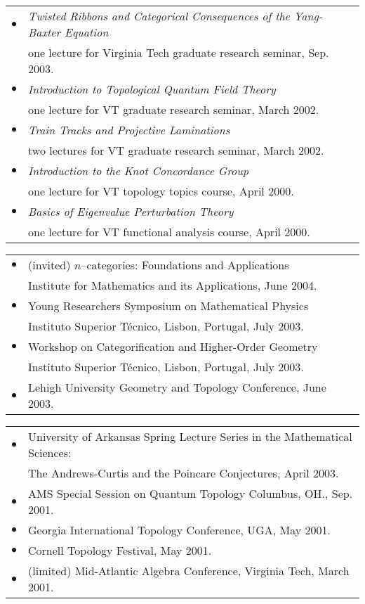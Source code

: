 \documentclass[10pt]{article}
\begin{document}

\begin{tabular}{ll}
$\bullet$&{\itshape Twisted Ribbons and Categorical Consequences of the Yang-Baxter Equation}\\
&one lecture for Virginia Tech graduate research seminar, Sep. 2003.\\
$\bullet$&{\itshape Introduction to Topological Quantum Field Theory}\\
&one lecture for VT graduate research seminar, March 2002.\\
$\bullet$&{\itshape Train Tracks and Projective Laminations}\\
&two lectures for VT graduate research seminar, March 2002.\\
$\bullet$&{\itshape Introduction to the Knot Concordance Group}\\
& one lecture for VT topology topics course, April 2000.\\
$\bullet$&{\itshape Basics of Eigenvalue Perturbation Theory}\\
& one lecture for VT functional analysis course, April 2000.\\
\end{tabular}
\newline


\begin{tabular}{ll}
$\bullet$&(invited) $n$--categories: Foundations
    and Applications\\
    &Institute for Mathematics and its Applications, June 2004. \\
$\bullet$&Young Researchers Symposium
on Mathematical Physics\\
&Instituto Superior T\'{e}cnico, Lisbon, Portugal, July 2003.\\  
$\bullet$&Workshop
  on Categorification and Higher-Order Geometry\\
&Instituto Superior T\'{e}cnico, Lisbon, Portugal, July 2003.\\
$\bullet$&Lehigh University Geometry and Topology Conference, June 2003.\\
\end{tabular}
\newline


\begin{tabular}{ll}
$\bullet$&University of Arkansas Spring Lecture Series
in the Mathematical Sciences:\\
&The Andrews-Curtis and the Poincare Conjectures, April 2003.\\
$\bullet$&AMS Special Session on Quantum Topology Columbus, OH., Sep. 2001.\\
$\bullet$&Georgia International Topology Conference, UGA, May 2001.\\
$\bullet$&Cornell Topology Festival, May 2001.\\
$\bullet$&(limited) Mid-Atlantic Algebra Conference, Virginia Tech, March 2001. \\
\end{tabular}
\newline
\end{document}
